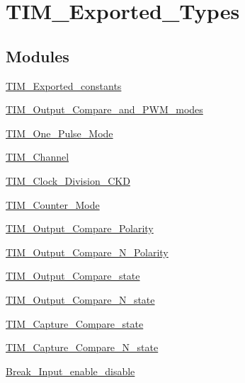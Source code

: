 \hypertarget{group___t_i_m___exported___types}{}\section{T\+I\+M\+\_\+\+Exported\+\_\+\+Types}
\label{group___t_i_m___exported___types}
\subsection*{Modules}
\begin{DoxyCompactItemize}
\item 
\mbox{\hyperlink{group___t_i_m___exported__constants}{T\+I\+M\+\_\+\+Exported\+\_\+constants}}
\item 
\mbox{\hyperlink{group___t_i_m___output___compare__and___p_w_m__modes}{T\+I\+M\+\_\+\+Output\+\_\+\+Compare\+\_\+and\+\_\+\+P\+W\+M\+\_\+modes}}
\item 
\mbox{\hyperlink{group___t_i_m___one___pulse___mode}{T\+I\+M\+\_\+\+One\+\_\+\+Pulse\+\_\+\+Mode}}
\item 
\mbox{\hyperlink{group___t_i_m___channel}{T\+I\+M\+\_\+\+Channel}}
\item 
\mbox{\hyperlink{group___t_i_m___clock___division___c_k_d}{T\+I\+M\+\_\+\+Clock\+\_\+\+Division\+\_\+\+C\+KD}}
\item 
\mbox{\hyperlink{group___t_i_m___counter___mode}{T\+I\+M\+\_\+\+Counter\+\_\+\+Mode}}
\item 
\mbox{\hyperlink{group___t_i_m___output___compare___polarity}{T\+I\+M\+\_\+\+Output\+\_\+\+Compare\+\_\+\+Polarity}}
\item 
\mbox{\hyperlink{group___t_i_m___output___compare___n___polarity}{T\+I\+M\+\_\+\+Output\+\_\+\+Compare\+\_\+\+N\+\_\+\+Polarity}}
\item 
\mbox{\hyperlink{group___t_i_m___output___compare__state}{T\+I\+M\+\_\+\+Output\+\_\+\+Compare\+\_\+state}}
\item 
\mbox{\hyperlink{group___t_i_m___output___compare___n__state}{T\+I\+M\+\_\+\+Output\+\_\+\+Compare\+\_\+\+N\+\_\+state}}
\item 
\mbox{\hyperlink{group___t_i_m___capture___compare__state}{T\+I\+M\+\_\+\+Capture\+\_\+\+Compare\+\_\+state}}
\item 
\mbox{\hyperlink{group___t_i_m___capture___compare___n__state}{T\+I\+M\+\_\+\+Capture\+\_\+\+Compare\+\_\+\+N\+\_\+state}}
\item 
\mbox{\hyperlink{group___break___input__enable__disable}{Break\+\_\+\+Input\+\_\+enable\+\_\+disable}}

\end{DoxyCompactItemize}
